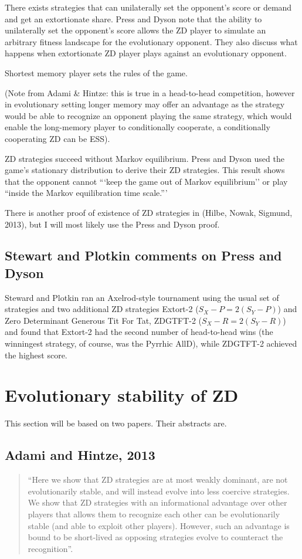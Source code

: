 \begin{theorem}
There exists strategies that can unilaterally set the opponent's score or demand and get an extortionate share. Press and Dyson note that the ability to unilaterally set the opponent's score allows the ZD player to simulate an arbitrary fitness landscape for the evolutionary opponent. They also discuss what happens when extortionate ZD player plays against an evolutionary opponent. 
\end{theorem}
\begin{theorem}
Shortest memory player sets the rules of the game.

(Note from Adami \& Hintze: this is true in a head-to-head competition, however in evolutionary setting longer memory may offer an advantage as the strategy would be able to recognize an opponent playing the same strategy, which would enable the long-memory player to conditionally cooperate, a conditionally cooperating ZD can be ESS).
\end{theorem}
\begin{theorem}
ZD strategies succeed without Markov equilibrium. Press and Dyson used the game's stationary distribution to derive their ZD strategies. This result shows that the opponent cannot  ```keep the game out of Markov equilibrium'' or play ``inside the Markov equilibration time scale.'''
\end{theorem}


There is another proof of existence of ZD strategies in (Hilbe, Nowak, Sigmund, 2013), but I will most likely use the Press and Dyson proof.

\subsection{Stewart and Plotkin comments on Press and Dyson}
Steward and Plotkin ran an Axelrod-style tournament using the usual set of strategies and two additional ZD strategies Extort-2 ($S_X - P = 2(S_Y - P)$) and Zero Determinant Generous Tit For Tat, ZDGTFT-2 ($S_X - R = 2(S_Y - R)$) and found that Extort-2 had the second number of head-to-head wins (the winningest strategy, of course, was the Pyrrhic AllD), while ZDGTFT-2 achieved the highest score.


\section{Evolutionary stability of ZD}
This section will be based on two papers. Their abstracts are.
\subsection{Adami and Hintze, 2013}
\begin{quote}``Here we show that ZD strategies are at most weakly dominant, are not evolutionarily stable, and will instead evolve into less coercive strategies. We show that ZD strategies with an informational advantage over other players that allows them to recognize each other can be evolutionarily stable (and able to exploit other players). However, such an advantage is bound to be short-lived as opposing strategies evolve to counteract the recognition''.
\end{quote}

